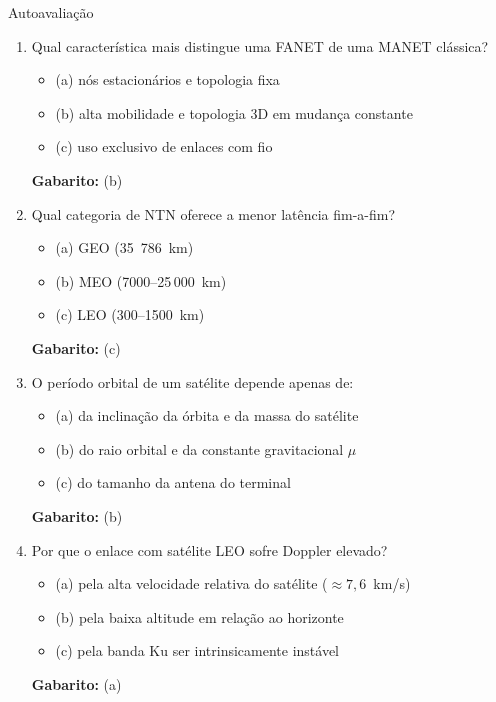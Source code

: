 \documentclass[aspectratio=169,11pt]{beamer}
\begin{document}
\begin{frame}{Autoavaliação}
  \begin{enumerate}
    \item Qual característica mais distingue uma FANET de uma MANET clássica?
      \begin{itemize}
        \item (a) nós estacionários e topologia fixa
        \item (b) alta mobilidade e topologia 3D em mudança constante
        \item (c) uso exclusivo de enlaces com fio
      \end{itemize}
      \pause
      \textbf{Gabarito:} (b)

    \item Qual categoria de NTN oferece a menor latência fim-a-fim?
      \begin{itemize}
        \item (a) GEO (35~786~km)
        \item (b) MEO (7000--25\,000~km)
        \item (c) LEO (300--1500~km)
      \end{itemize}
      \pause
      \textbf{Gabarito:} (c)

    \item O período orbital de um satélite depende apenas de:
      \begin{itemize}
        \item (a) da inclinação da órbita e da massa do satélite
        \item (b) do raio orbital e da constante gravitacional $\mu$
        \item (c) do tamanho da antena do terminal
      \end{itemize}
      \pause
      \textbf{Gabarito:} (b)

    \item Por que o enlace com satélite LEO sofre Doppler elevado?
      \begin{itemize}
        \item (a) pela alta velocidade relativa do satélite ($\approx 7{,}6$~km/s)
        \item (b) pela baixa altitude em relação ao horizonte
        \item (c) pela banda Ku ser intrinsicamente instável
      \end{itemize}
      \pause
      \textbf{Gabarito:} (a)
  \end{enumerate}
\end{frame}
\end{document}
